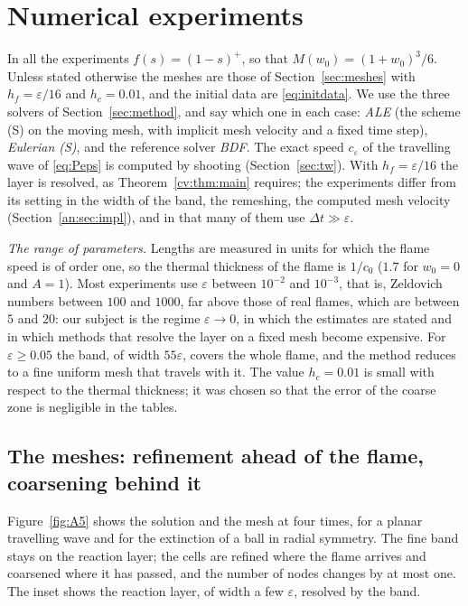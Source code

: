 \documentclass[11pt]{amsart}
\theoremstyle{definition}
\theoremstyle{remark}
\newcommand{\ve}{\varepsilon}
\begin{document}
\section{Numerical experiments}\label{sec:experiments}

In all the experiments $f(s)=(1-s)^+$, so that $M(w_0)=(1+w_0)^3/6$. Unless stated
otherwise the meshes are those of Section~\ref{sec:meshes} with $h_f=\ve/16$ and
$h_c=0.01$, and the initial data are \eqref{eq:initdata}. We use the three solvers
of Section~\ref{sec:method}, and say which one in each case: \emph{ALE} (the scheme
(S) on the moving mesh, with implicit mesh velocity and a fixed time step),
\emph{Eulerian (S)}, and the reference solver \emph{BDF}. The exact speed $c_\ve$ of the
travelling wave of \eqref{eq:Peps} is computed by shooting (Section~\ref{sec:tw}). With
$h_f=\ve/16$ the layer is resolved, as Theorem~\ref{cv:thm:main} requires; the experiments
differ from its setting in the width of the band, the remeshing, the computed mesh
velocity (Section~\ref{an:sec:impl}), and in that many of them use $\Delta t\gg\ve$.

\emph{The range of parameters.} Lengths are measured in units for which the flame speed
is of order one, so the thermal thickness of the flame is $1/c_0$ ($1.7$ for $w_0=0$ and
$A=1$). Most experiments use $\ve$ between $10^{-2}$ and $10^{-3}$, that is, Zeldovich numbers
between $100$ and $1000$, far above those of real flames, which are between $5$ and $20$:
our subject is the regime $\ve\to0$, in which the estimates are stated and in which methods
that resolve the layer on a fixed mesh become expensive. For $\ve\ge0.05$ the band, of
width $55\ve$, covers the whole flame, and the method reduces to a fine uniform mesh that
travels with it. The value $h_c=0.01$ is small with respect to the thermal thickness; it
was chosen so that the error of the coarse zone is negligible in the tables.

\subsection{The meshes: refinement ahead of the flame, coarsening behind it}

Figure~\ref{fig:A5} shows the solution and the mesh at four times, for a planar
travelling wave and for the extinction of a ball in radial symmetry. The fine band
stays on the reaction layer; the cells are refined where the flame arrives and
coarsened where it has passed, and the number of nodes changes by at most one. The inset
shows the reaction layer, of width a few $\ve$, resolved by the band.
\end{document}
